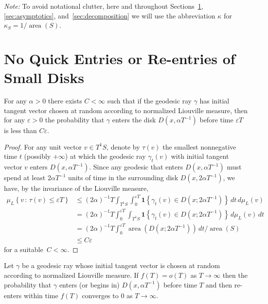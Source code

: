 \documentclass[10pt]{amsart}
\theoremstyle{definition}\newtheorem{defi}[theo]{Definition}\newtheorem{rema}[theo]{Remark}\newtheorem{exam}[theo]{Example}\newtheorem{exem}[theo]{Example}\newtheorem{nota}[theo]{Notation}
\newcommand{\xset}[1]{\left\{ #1 \right\}}
\DeclareMathOperator{\area}{area}
\begin{document}
\noindent
\emph{Note:} To avoid notational clutter, here and throughout Sections~\ref{sec:no-prefixes},\ref{sec:asymptotics}, and~\ref{sec:decomposition} we will use the abbreviation $\kappa$ for $\kappa_{S}=1/\area(S)$.


\section{No Quick Entries or Re-entries of Small Disks}\label{sec:no-prefixes}



\begin{prop}\label{proposition:no-quick-entries}
For any $\alpha>0$ there exists $C<\infty$ such that if the geodesic ray $\gamma$ has initial tangent vector chosen at random according to normalized Liouville measure, then for any $\varepsilon>0$ the probability that $\gamma$ enters the disk $D(x,\alpha T^{-1})$ before time $\varepsilon T$ is less than $C \varepsilon$.
\end{prop}

\begin{proof}
For any unit vector $v \in T^{1}S$, denote by $\tau (v)$ the smallest nonnegative time $t$ (possibly $+\infty$) at which the geodesic ray $\gamma_{t}(v)$ with initial tangent vector $v$ enters $D(x,\alpha T^{-1})$. Since any geodesic that enters $D(x, \alpha T^{-1})$ must spend at least $2\alpha T^{-1}$ units of time in the surrounding disk $D(x, 2 \alpha T^{-1})$, we have, by the invariance of the Liouville measure,
\begin{align*}
\mu_{L} \xset {v\,:\, \tau (v)\leq \varepsilon T}&\leq (2\alpha)^{-1}T\int_{T^{1}S} \int_{0}^{\varepsilon T}\mathbf{1} \xset { \gamma_{t}(v)\in D(x;2\alpha T^{-1}) }\, dt \, d\mu_{L}(v) \\
&= (2\alpha)^{-1}T \int_{0}^{\varepsilon T} \int_{T^{1}S} \mathbf{1} \xset { \gamma_{t}(v)\in D(x;2\alpha T^{-1}) }\, d \mu_{L}(v) \,dt \\
&= (2\alpha)^{-1}T \int_{0}^{\varepsilon T} \area \left(D(x;2\alpha T^{-1})\right) \, dt/ \area(S)\\
& \leq C \varepsilon
\end{align*}
for a suitable~$C< \infty$.
\end{proof}


\goodbreak
\begin{prop}\label{proposition:no-quick-returns}
Let $\gamma$ be a geodesic ray whose initial tangent vector is chosen at random according to normalized Liouville measure. If $f(T)=o(T)$ as $T \rightarrow \infty$ then the probability that $\gamma$ enters (or begins in) $D(x,\alpha T^{-1})$ before time $T$ and then re-enters within time $f(T)$ converges to $0$ as $T \rightarrow \infty$.
\end{prop}
\end{document}

